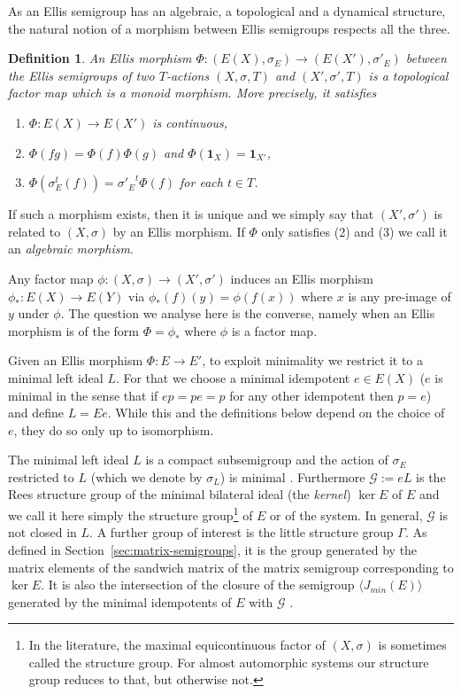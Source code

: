 \documentclass[10pt,a4paper]{amsart}
\newtheorem{definition}[theorem]{Definition}
\numberwithin{equation}{section}
\newcommand{\Gg}{{\mathcal G}}
\newcommand{\id}{{\mathbf 1}}
\begin{document}
As an Ellis semigroup has an algebraic, a topological and a dynamical structure, the natural notion of a morphism between Ellis semigroups respects all the three.



\begin{definition}
An {\em Ellis  morphism} $\Phi: (E(X), \sigma_E)\rightarrow( E(X'), \sigma'_E)$ between the Ellis semigroups of two $T$-actions $(X,\sigma,T)$ and $(X',\sigma',T)$ is a topological  factor map which is a monoid morphism. More precisely, it satisfies \begin{enumerate}
\item $\Phi: E(X)\rightarrow E(X')$ is continuous,
\item $\Phi(fg) = \Phi(f) \Phi(g)$ and $\Phi (\id_X)= \id_{X'}$, 
\item
$\Phi(\sigma_E^{t}(f))= {\sigma'_E}^{t}\Phi(f)$ for each $t\in T$.
\end{enumerate}
 \end{definition}
If  such a morphism exists, then it is unique and we simply say that $(X',\sigma')$ is  related to $(X,\sigma)$ by an Ellis morphism. 
If $\Phi$  only satisfies (2) and (3) we call it an {\em algebraic morphism}. 

Any factor map  $\phi:(X, \sigma)\to (X',\sigma')$ induces an Ellis  morphism  
$\phi_*: E(X) \to E(Y)$ via $\phi_*(f)(y) = \phi(f(x))$ where $x$ is any pre-image of $y$ under $\phi$. The question we analyse here is the converse, namely when  an Ellis morphism is of the form $\Phi=\phi_*$ where $\phi$ is a factor map.
 

Given an Ellis morphism $\Phi:E\to E'$, 
to exploit minimality we restrict it to a minimal left ideal $L$. For that we
choose a minimal idempotent $e\in E(X)$ ($e$ is minimal in the sense that if $ep=pe=p$ for any other idempotent then $p=e$) and define $L=Ee$. 
While this and the definitions below depend on the choice of $e$, they do so only up to isomorphism. 

The minimal left ideal $L$ is a  compact subsemigroup and the action of $\sigma_E$ restricted to $L$ (which we denote by $\sigma_L$) is minimal \cite{Auslander1988}. 
Furthermore $\Gg := eL$ is the Rees structure group of the minimal bilateral ideal (the {\em kernel}) $\ker E$ of $E$ and we call it here simply the structure group\footnote{In the literature, the maximal equicontinuous factor of $(X,\sigma)$ is sometimes called the structure group. For almost automorphic systems our structure group reduces to that, but otherwise not.} 
 of $E$ or of the system. In general, $\Gg$ is not closed in $L$. A further group of interest is the little structure group $\Gamma$. As defined in Section~\ref{sec:matrix-semigroups},  it is the group generated by the matrix elements of the sandwich matrix of the matrix semigroup corresponding to  $\ker E$. It is also the intersection of the closure of the semigroup  $\langle J_{min}(E)\rangle $ generated by the minimal idempotents of $E$ with $\Gg$ \cite{ESBS}.
\end{document}
